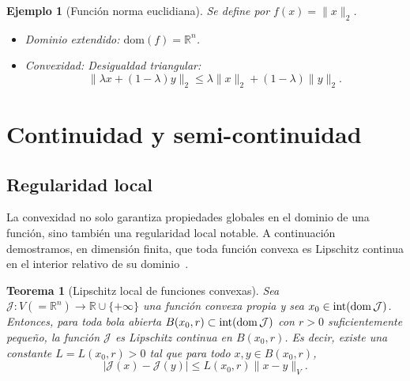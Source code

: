 \documentclass[12pt]{book}
\newtheorem{theorem}{Teorema}
\newtheorem{ex}{Ejemplo}
\theoremstyle{definition}
\theoremstyle{plain}
\theoremstyle{remark}
\begin{document}
\begin{ex}
[Función norma euclidiana]  

  Se define por \( f(x) = \|x\|_2 \).
    \begin{itemize}
        \item \emph{Dominio extendido:} \( \text{dom}(f) = \mathbb{R}^n \).
        \item \emph{Convexidad:} Desigualdad triangular:
        \[
        \|\lambda x + (1-\lambda)y\|_2 \leq \lambda \|x\|_2 + (1-\lambda)\|y\|_2.
        \]
    \end{itemize}
\end{ex}


\section{Continuidad y semi-continuidad}

\subsection{Regularidad local} %

La convexidad no solo garantiza propiedades globales en el dominio de una función, sino también una regularidad local notable. A continuación demostramos, en dimensión finita, que toda función convexa es Lipschitz continua en el interior relativo de su dominio~\cite{hiriart2001}.

\begin{theorem}[Lipschitz local de funciones convexas]
    Sea \( \mathcal{J} \colon V(=\mathbb{R}^n) \to {\mathbb{R}} \cup \{+\infty\} \) una función convexa propia y sea \( x_0 \in \textup{int}(\textup{dom}\,\mathcal{J}) \). Entonces, para toda bola abierta \( B(x_0, r) \subset \textup{int}(\textup{dom}\,\mathcal{J}) \) con \( r > 0 \) suficientemente pequeño, la función \( \mathcal{J} \) es Lipschitz continua  
    en \( B(x_0, r) \). Es decir, existe una constante \( L = L(x_0, r) > 0 \) tal que para todo \( x, y \in B(x_0, r) \),
    \[
    |\mathcal{J}(x) - \mathcal{J}(y)| \leq L(x_0,r) \|x - y\|_V.
    \]
\end{theorem}
\end{document}
